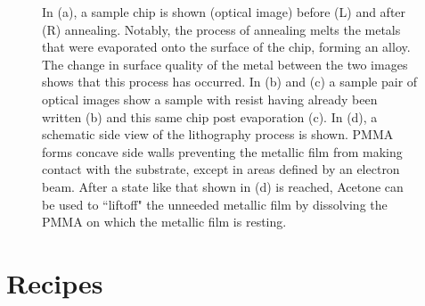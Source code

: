 \begin{figure}[h]
\centering
{}
\caption{In (a), a sample chip is shown (optical image) before (L) and after (R) annealing. Notably, the process of annealing melts the metals that were evaporated onto the surface of the chip, forming an alloy. The change in surface quality of the metal between the two images shows that this process has occurred. In (b) and (c) a sample pair of optical images show a sample with resist having already been written (b) and this same chip post evaporation (c). In (d), a schematic side view of the lithography process is shown. PMMA forms concave side walls preventing the metallic film from making contact with the substrate, except in areas defined by an electron beam. After a state like that shown in (d) is reached, Acetone can be used to ``liftoff" the unneeded metallic film by dissolving the PMMA on which the metallic film is resting.}
\label{fig:fab}       
\end{figure}

\section{Recipes}
\label{sec:recipes}

